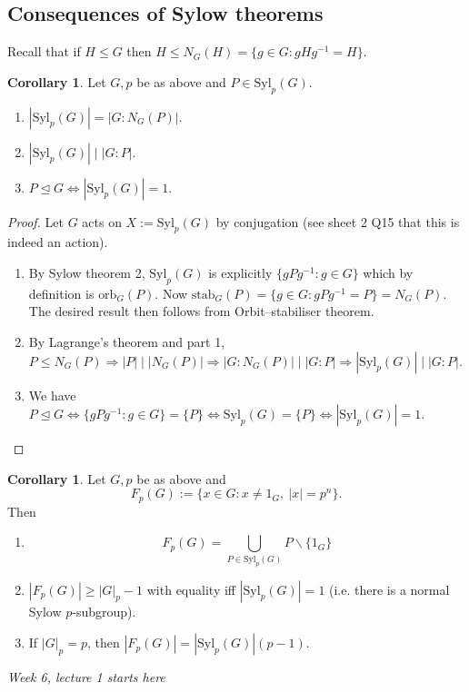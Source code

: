 \documentclass[a4paper]{article}
\newcommand{\Syl}{\text{Syl}}
\newcommand{\orb}{\text{orb}}
\newcommand{\stab}{\text{stab}}
\theoremstyle{definition}
\newtheorem{coro}[defn]{Corollary}
\begin{document}
\subsection{Consequences of Sylow theorems}
Recall that if $H\leq G$ then $H\leq N_G(H)=\{g\in G:gHg^{-1}=H\}$.

\begin{coro}
\label{coro:consequence1Sylow}
Let $G,p$ be as above and $P\in \Syl_p(G)$.
\begin{enumerate}
\item $|\Syl_p(G)|=|G:N_G(P)|$.
\item $|\Syl_p(G)|\mid |G:P|$.
\item $P\unlhd G\Leftrightarrow |\Syl_p(G)|=1$.
\end{enumerate}
\end{coro}
\begin{proof}
Let $G$ acts on $X:=\Syl_p(G)$ by conjugation (see sheet 2 Q15 that this is indeed an action).
\begin{enumerate}
\item By Sylow theorem 2, $\Syl_p(G)$ is explicitly $\{gPg^{-1}:g\in G\}$ which by definition is $\orb_G(P)$. Now $\stab_G(P)=\{g\in G:gPg^{-1}=P\}=N_G(P)$. The desired result then follows from Orbit–stabiliser theorem.
\item By Lagrange's theorem and part 1, $P\leq N_G(P)\Rightarrow |P| \mid |N_G(P)| \Rightarrow |G:N_G(P)| \mid |G:P|\Rightarrow |\Syl_p(G)| \mid |G:P|$.
\item We have $P\unlhd G\Leftrightarrow \{gPg^{-1}:g\in G\}=\{P\}\Leftrightarrow \Syl_p(G)=\{P\}\Leftrightarrow |\Syl_p(G)|=1$.
\end{enumerate}
\end{proof}

\begin{coro}
\label{coro:consequence2Sylow}
Let $G,p$ be as above and
\[
F_p(G):=\{x\in G:x\neq 1_G,\ |x|=p^n\}.
\]
Then
\begin{enumerate}
\item \[
F_p(G)=\bigcup_{P\in\Syl_p(G)} P\backslash \{1_G\}
\]
\item $|F_p(G)|\geq |G|_p-1$ with equality iff $|\Syl_p(G)|=1$ (i.e. there is a normal Sylow $p$-subgroup).
\item If $|G|_p=p$, then $|F_p(G)|=|\Syl_p(G)|(p-1)$.
\end{enumerate}
\end{coro}

\begin{flushright}
\textit{Week 6, lecture 1 starts here}
\end{flushright}
\end{document}
